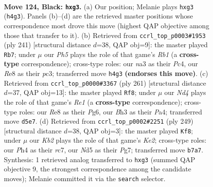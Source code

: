\documentclass[11pt]{article}
\begin{document}
\clearpage

\begin{figure}[p]\centering
\begin{subfigure}{0.46\textwidth}\centering
\resizebox{\linewidth}{!}{%
\newchessgame
\chessboard[
  setfen={4r3/1k5K/p7/P2n1p2/5B1p/N5Pb/8/7R b - - 9 124},
  showmover=false,
  pgfstyle=straightmove, color=movearrow, markmove={h4-g3}
]}
\caption{}
\end{subfigure}\hfill
\begin{subfigure}{0.46\textwidth}\centering
\resizebox{\linewidth}{!}{%
\newchessgame
\chessboard[
  setfen={1r6/8/3k4/1bR5/p1p1p3/K1P1B3/2P2P2/8 b - - 25 121},
  showmover=false,
  pgfstyle=straightmove, color=movearrow, markmove={b8-b7}
]}
\caption{}
\end{subfigure}
\\[4pt]
\begin{subfigure}{0.46\textwidth}\centering
\resizebox{\linewidth}{!}{%
\newchessgame
\chessboard[
  setfen={4r3/8/2k3p1/1b1p4/pR6/P3BP2/3K4/8 b - - 19 131},
  showmover=false,
  pgfstyle=straightmove, color=movearrow, markmove={e8-f8}
]}
\caption{}
\end{subfigure}\hfill
\begin{subfigure}{0.46\textwidth}\centering
\resizebox{\linewidth}{!}{%
\newchessgame
\chessboard[
  setfen={4b3/2R1k1p1/4p2p/4Pp1P/3r4/8/4BPK1/8 b - - 10 125},
  showmover=false,
  pgfstyle=straightmove, color=movearrow, markmove={e7-f8}
]}
\caption{}
\end{subfigure}
\caption{\textbf{Move 124, Black: \texttt{hxg3}.} (a) Our position; Melanie plays \texttt{hxg3} (\texttt{h4g3}). Panels (b)--(d) are the retrieved master positions whose correspondence most drove this move (highest QAP objective among those that transfer to it). (b) Retrieved from \texttt{ccrl\_top\_p0003\#1953} (ply 241) [structural distance $d$=38, QAP obj=9]: the master played \texttt{Rb7}; under $\mu$ our \emph{Ph5} plays the role of that game's \emph{Rb1} (a \textbf{cross-type} correspondence); cross-type roles: our \emph{n}a3 as their \emph{P}c4, our \emph{R}e8 as their \emph{p}c3; transferred move \texttt{h4g3} \textbf{(endorses this move)}. (c) Retrieved from \texttt{ccrl\_top\_p0000\#3367} (ply 261) [structural distance $d$=37, QAP obj=13]: the master played \texttt{Rf8}; under $\mu$ our \emph{Nd4} plays the role of that game's \emph{Re1} (a \textbf{cross-type} correspondence); cross-type roles: our \emph{R}e8 as their \emph{P}g6, our \emph{B}h3 as their \emph{P}a4; transferred move \texttt{d5e7}. (d) Retrieved from \texttt{ccrl\_top\_p0002\#2251} (ply 249) [structural distance $d$=38, QAP obj=3]: the master played \texttt{Kf8}; under $\mu$ our \emph{Kb2} plays the role of that game's \emph{Ke2}; cross-type roles: our \emph{P}h4 as their \emph{r}c7, our \emph{N}d5 as their \emph{P}g7; transferred move \texttt{b7a7}. Synthesis: 1 retrieved analog transferred to \texttt{hxg3} (summed QAP objective 9, the strongest correspondence among the candidate moves); Melanie committed it via the \texttt{search} selector.}
\label{fig:thought-m247}
\end{figure}
\end{document}
